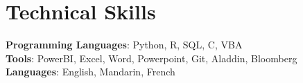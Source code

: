 \documentclass[letterpaper,11pt]{article}
\makeatletter
\newcommand{\resumeItem}[1]{
  \item\small{
    {#1 \vspace{-2pt}}
  }
}
\newcommand{\resumeProjectHeading}[2]{
    \item
    \begin{tabular*}{0.97\textwidth}{l@{\extracolsep{\fill}}r}
      \small#1 & #2 \\
    \end{tabular*}\vspace{-7pt}
}
\newcommand{\resumeSubHeadingListEnd}{\end{itemize}}
\newcommand{\resumeItemListStart}{\begin{itemize}}
\newcommand{\resumeItemListEnd}{\end{itemize}\vspace{-5pt}}
\makeatother
\begin{document}

  
        
        
        



\section{Technical Skills}
\begin{itemize}[leftmargin=0.15in, label={}]
   \small{\item{
    \textbf{Programming Languages}{: Python, R, SQL, C, VBA} \\
    \textbf{Tools}{: PowerBI, Excel, Word, Powerpoint, Git, Aladdin, Bloomberg} \\
    \textbf{Languages}{: English, Mandarin, French} \\
   }}
 \end{itemize}
\end{document}
